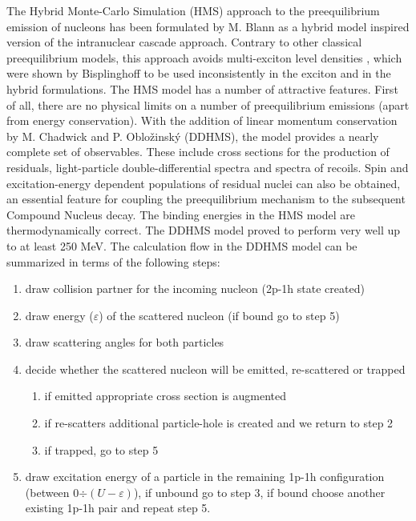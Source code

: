 The Hybrid Monte-Carlo Simulation (HMS) approach to the preequilibrium
emission of nucleons has been formulated by M. Blann \cite{Blann-HMS} as a
hybrid model \cite{hybrid,hybrid1,hybrid2,hybrid3} inspired version of the
intranuclear cascade approach. Contrary to other classical preequilibrium
models, this approach avoids multi-exciton level densities%
, which were shown by Bisplinghoff \cite%
{Bisplinghoff} to be used inconsistently in the exciton and in the hybrid
formulations. The HMS%
 model has a number of attractive features. First of all, there
are no physical limits on a number of preequilibrium emissions (apart from
energy conservation). With the addition of linear momentum conservation by
M. Chadwick and P. Oblo\v zinsk\' y (DDHMS), the model provides a nearly
complete set of observables. These include cross sections for the production
of residuals, light-particle double-differential spectra and spectra of
recoils. Spin and excitation-energy dependent populations of residual nuclei
can also be obtained, an essential feature for coupling the preequilibrium
mechanism to the subsequent Compound Nucleus decay. The binding energies in
the HMS%
 model are thermodynamically correct. The DDHMS model proved to
perform very well
up to at least 250 MeV. %
The calculation flow in the DDHMS model can be summarized in terms of the
following steps:

\begin{enumerate}
\item draw collision partner for the incoming nucleon (2p-1h state created)

\item draw energy ($\varepsilon$) of the scattered nucleon (if bound go to
step 5)

\item draw scattering angles for both particles

\item decide whether the scattered nucleon will be emitted, re-scattered or
trapped

\begin{enumerate}
\item if emitted appropriate cross section is augmented

\item if re-scatters additional particle-hole is created and we return to
step 2

\item if trapped, go to step 5
\end{enumerate}

\item draw excitation energy of a particle in the remaining 1p-1h
configuration (between 0$\div(U-\varepsilon)$), if unbound go to step 3, if
bound choose another existing 1p-1h pair and repeat step 5.
\end{enumerate}

